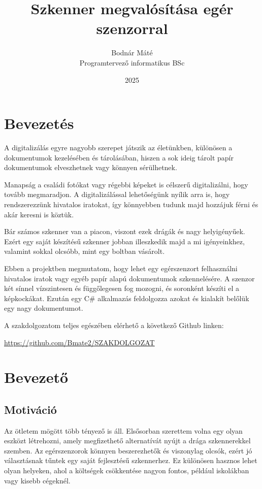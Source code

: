 \documentclass[]{thesis-ekf}
\theoremstyle{definition}
\theoremstyle{remark}
\begin{document}
	
	\title{Szkenner megvalósítása egér szenzorral}
	\author{Bodnár Máté\\Programtervező informatikus BSc}
	\date{2025}
	\maketitle
	
	\tableofcontents
	
	\chapter*{Bevezetés}
	A digitalizálás egyre nagyobb szerepet játszik az életünkben, különösen a dokumentumok kezelésében és tárolásában, hiszen a sok ideig tárolt papír dokumentumok elveszhetnek vagy könnyen sérülhetnek.
	
	Manapság a családi fotókat vagy régebbi képeket is célszerű digitalizálni, hogy tovább megmaradjon. A digitalizálással lehetőségünk nyílik arra is, hogy rendszerezzünk hivatalos iratokat, így könnyebben tudunk majd hozzájuk férni és akár keresni is köztük. 
	
	Bár számos szkenner van a piacon, viszont ezek drágák és nagy helyigényűek. Ezért egy saját készítésű szkenner jobban illeszkedik majd a mi igényeinkhez, valamint sokkal olcsóbb, mint egy boltban vásárolt. 
	
	Ebben a projektben megmutatom, hogy lehet egy egérszenzort felhasználni hivatalos iratok vagy egyéb papír alapú dokumentumok szkennelésére. A szenzor két sínnel vízszintesen és függőlegesen fog mozogni, és soronként készíti el a képkockákat. Ezután egy C\# alkalmazás feldolgozza azokat és kialakít belőlük egy nagy dokumentumot.
	
	A szakdolgozatom teljes egészében elérhető a következő Github linken:
	
	\url{https://github.com/Bmate2/SZAKDOLGOZAT}
	
	\chapter{Bevezető}
	
	\section{Motiváció}
	Az ötletem mögött több tényező is áll. Elsősorban szerettem volna egy olyan eszközt létrehozni, amely megfizethető alternatívát nyújt a drága szkennerekkel szemben. Az egérszenzorok könnyen beszerezhetők és viszonylag olcsók, ezért jó választásnak tűntek egy saját fejlesztésű szkennerhez. Ez különösen hasznos lehet olyan helyeken, ahol a költségek csökkentése nagyon fontos, például iskolákban vagy kisebb cégeknél.
	
\end{document}
